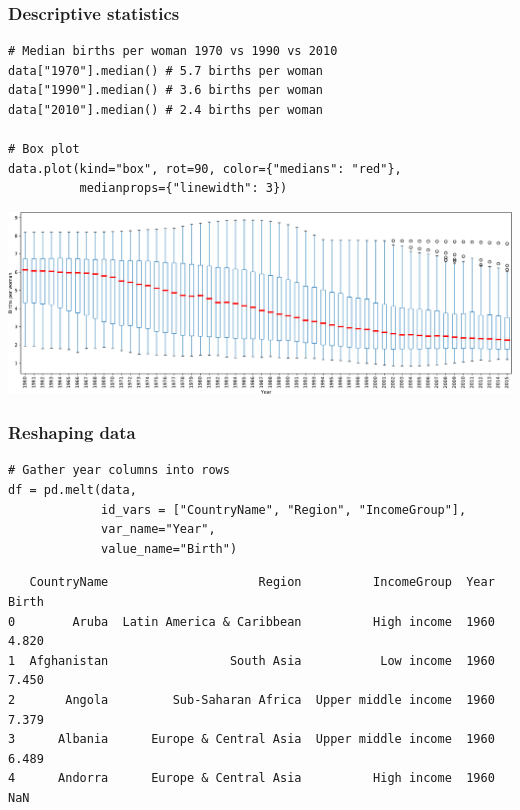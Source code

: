 \documentclass[xcolor=table]{beamer}
\begin{document}
\begin{frame}[fragile]
\frametitle{Descriptive statistics}

\begin{lstlisting}[style=python]
# Median births per woman 1970 vs 1990 vs 2010
data["1970"].median() # 5.7 births per woman
data["1990"].median() # 3.6 births per woman 
data["2010"].median() # 2.4 births per woman

# Box plot
data.plot(kind="box", rot=90, color={"medians": "red"}, 
          medianprops={"linewidth": 3})
\end{lstlisting}

\vspace{-0.6cm}
\begin{center}
	\includegraphics[width=\textwidth]{boxplot.pdf}
\end{center}

\end{frame}

\begin{frame}[fragile]
\frametitle{Reshaping data}

\begin{lstlisting}[style=python]
# Gather year columns into rows
df = pd.melt(data, 
             id_vars = ["CountryName", "Region", "IncomeGroup"], 
             var_name="Year", 
             value_name="Birth")
\end{lstlisting}

{\fontsize{8}{8}\selectfont
\begin{verbatim}
   CountryName                     Region          IncomeGroup  Year  Birth
0        Aruba  Latin America & Caribbean          High income  1960  4.820
1  Afghanistan                 South Asia           Low income  1960  7.450
2       Angola         Sub-Saharan Africa  Upper middle income  1960  7.379
3      Albania      Europe & Central Asia  Upper middle income  1960  6.489
4      Andorra      Europe & Central Asia          High income  1960    NaN 
\end{verbatim}}

\end{frame}
\end{document}
